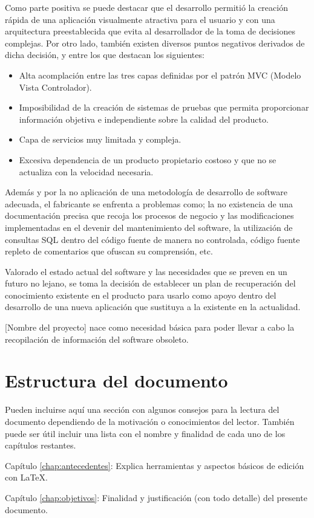 Como parte positiva se puede destacar que el desarrollo permitió la creación rápida de una aplicación visualmente atractiva para el usuario y con una arquitectura preestablecida que evita al desarrollador de la toma de decisiones complejas.
Por otro lado, también existen diversos puntos negativos derivados de dicha decisión, y entre los que destacan los siguientes:
\begin{itemize}
\item Alta acomplación entre las tres capas definidas por el patrón MVC (Modelo Vista Controlador).
\item Imposibilidad de la creación de sistemas de pruebas que permita proporcionar información objetiva e independiente sobre la calidad del producto.
\item Capa de servicios muy limitada y compleja.
\item Excesiva dependencia de un producto propietario costoso y que no se actualiza con la velocidad necesaria.
\end{itemize}

Además y por la no aplicación de una metodología de desarrollo de software adecuada, el fabricante se enfrenta a problemas como; la no existencia de una documentación precisa que recoja los procesos de negocio y las modificaciones implementadas en el devenir del mantenimiento del software, la utilización de consultas SQL dentro del código fuente de manera no controlada, código fuente repleto de comentarios que ofuscan su comprensión, etc.

Valorado el estado actual del software y las necesidades que se preven en un futuro no lejano, se toma la decisión de establecer un plan de recuperación del conocimiento existente en el producto para usarlo como apoyo dentro del desarrollo de una nueva aplicación que sustituya a la existente en la actualidad.

[Nombre del proyecto] nace como necesidad básica para poder llevar a cabo la recopilación de información del software obsoleto. 


\section{Estructura del documento}

Pueden incluirse aquí una sección con algunos consejos para la lectura del
documento dependiendo de la motivación o conocimientos del lector.  También
puede ser útil incluir una lista con el nombre y finalidad de cada uno de los
capítulos restantes.


\begin{definitionlist}
\item[Capítulo \ref{chap:antecedentes}: \nameref{chap:antecedentes}] Explica herramientas
  y aspectos básicos de edición con \LaTeX.
\item[Capítulo \ref{chap:objetivos}: \nameref{chap:objetivos}] Finalidad y justificación
  (con todo detalle) del presente documento.
\end{definitionlist}

